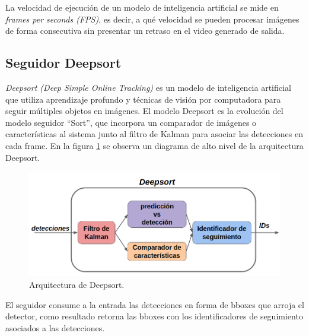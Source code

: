 La velocidad de ejecución de un modelo de inteligencia artificial se mide en \textit{frames per seconds (FPS)}, es decir, a qué velocidad se pueden procesar imágenes de forma consecutiva sin presentar un retraso en el video generado de salida.

\subsection{Seguidor Deepsort}

\textit{Deepsort (Deep Simple Online Tracking)} \citep{DEEPSORT_PAPER} es un modelo de inteligencia artificial que utiliza aprendizaje profundo y técnicas de visión por computadora para seguir múltiples objetos en imágenes. El modelo Deepsort es la evolución del modelo seguidor ``Sort'', que incorpora un comparador de imágenes o características al sistema junto al filtro de Kalman \citep{KALMAN_FILTER} para asociar las detecciones en cada frame. En la figura \ref{fig:deepsortArq} se observa un diagrama de alto nivel de la arquitectura Deepsort.

\begin{figure}[ht]
	\centering
	\includegraphics[scale=.55]{./Figures/deepsort.png}
	\caption{Arquitectura de Deepsort\protect\footnotemark.}
	\label{fig:deepsortArq}
\end{figure}


El seguidor consume a la entrada las detecciones en forma de bboxes que arroja el detector, como resultado retorna las bboxes con los identificadores de seguimiento asociados a las detecciones.

\newpage

